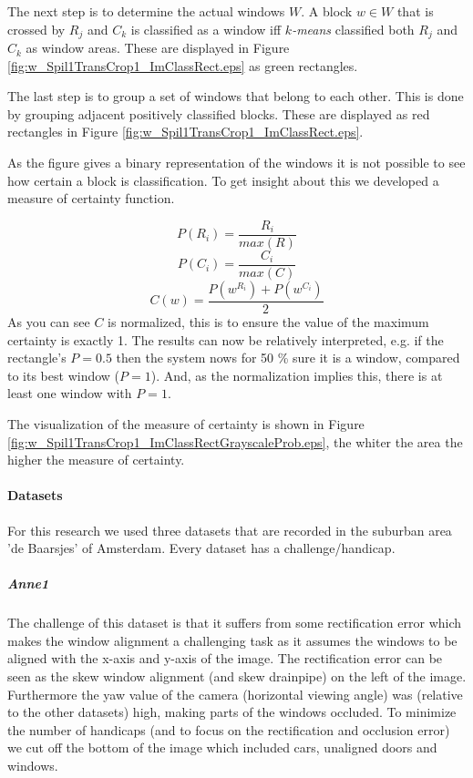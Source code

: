 The next step is to determine the actual windows $W$.
A block $w\in W$ that is crossed by $R_j$ and $C_k$ is classified as a
window iff \emph{$k$-means} classified both $R_j$ and $C_k$ as window areas. These are displayed in 
 Figure \ref{fig:w_Spil1TransCrop1_ImClassRect.eps} as green rectangles.

The last step is to group a set of windows that belong to each other. This is done by 
grouping adjacent positively classified blocks. These are displayed as red
rectangles in Figure \ref{fig:w_Spil1TransCrop1_ImClassRect.eps}.

As the figure gives a binary representation of the windows it is not possible
to see how certain a block is classification.
To get insight about this we developed a measure of certainty function.

\[P(R_i) = \frac{R_i}{max(R)}\]
\[P(C_i) = \frac{C_i}{max(C)}\]
\[C(w) = \frac{P(w^{R_i}) + P(w^{C_i})}{2}\]
As you can see $C$ is normalized, this is to ensure the value of the maximum
certainty is exactly 1. The results can now be relatively interpreted, e.g. if the rectangle's $P=0.5$
then the system nows for 50 \% sure it is a window, compared to its best window ($P=1$). 
And, as the normalization implies this, there is at least one window with $P=1$. 

The visualization of the measure of certainty is shown in Figure
\ref{fig:w_Spil1TransCrop1_ImClassRectGrayscaleProb.eps},  
the whiter the area the higher the measure of certainty.


\paragraph{Datasets}
For this research we used three datasets that are recorded in the suburban area
'de Baarsjes' of Amsterdam.  Every dataset has a challenge/handicap.

\subparagraph{Anne1}
The challenge of this dataset is that it suffers from some rectification error
which makes the window alignment a challenging task as it assumes the windows to
be aligned with the x-axis and y-axis of the image.
The rectification error can be seen as the skew window alignment (and skew
drainpipe) on the left of the image. 
Furthermore the yaw value of the camera (horizontal viewing angle) was (relative
to the other datasets) high, making parts of the windows occluded.
To minimize the number of handicaps (and to focus on the rectification and
occlusion error) we cut off the bottom of the image which included cars, unaligned doors and windows.

